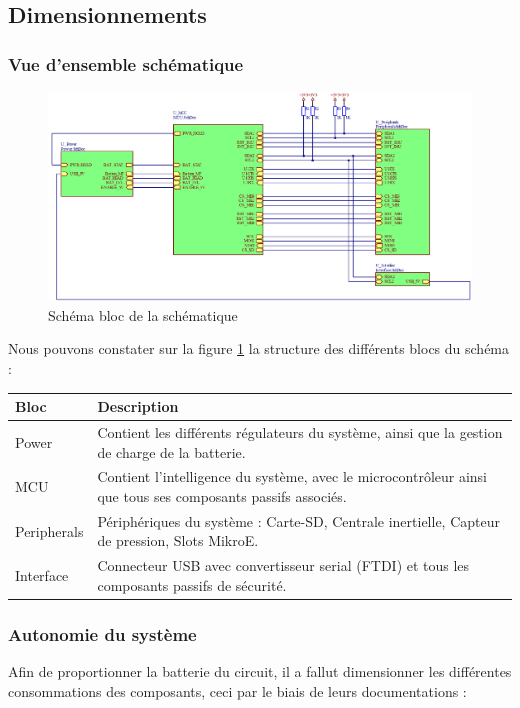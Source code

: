 \subsection{Dimensionnements} \label{ssec:num31}
{
	\subsubsection{Vue d'ensemble schématique} \label{sssec:SchemaBloc}
	{
		\begin{figure}[th]
			\centering
			\includegraphics[width=1.1\linewidth]{Figures/Dev-SCH/schemaBloc}
			\caption{Schéma bloc de la schématique}
			\label{fig:schemablocSCH}
		\end{figure}
		
		Nous pouvons constater sur la figure \ref{fig:schemablocSCH} la structure des différents blocs du schéma : \vspace{+5mm}
		
		\begin{tabularx}{18cm}{|X|X|}
			\hline
			Bloc & Description \\
			\hline
			\hline
			Power & Contient les différents régulateurs du système, ainsi que la gestion de charge de la batterie. \\
			\hline
			MCU & Contient l'intelligence du système, avec le microcontrôleur ainsi que tous ses composants passifs associés. \\
			\hline
			Peripherals & Périphériques du système : Carte-SD, Centrale inertielle, Capteur de pression, Slots MikroE. \\ 
			\hline
			Interface & Connecteur USB avec convertisseur serial (FTDI) et tous les composants passifs de sécurité. \\
			\hline
		\end{tabularx}
	}


	\clearpage
	\subsubsection{Autonomie du système} \label{sssec:SysAutonomie}
	{
		Afin de proportionner la batterie du circuit, il a fallut dimensionner les différentes consommations des composants, ceci par le biais de leurs documentations :
		
}}
